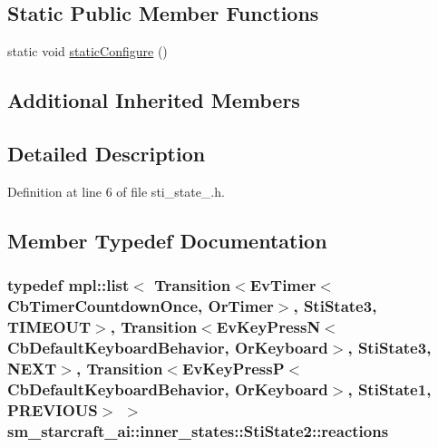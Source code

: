 \subsection*{Static Public Member Functions}
\begin{DoxyCompactItemize}
\item 
static void \hyperlink{structsm__starcraft__ai_1_1inner__states_1_1StiState2_ae80399d0de806abcde8ee983fdd1d719}{static\+Configure} ()
\end{DoxyCompactItemize}
\subsection*{Additional Inherited Members}


\subsection{Detailed Description}


Definition at line 6 of file sti\+\_\+state\+\_.\+h.



\subsection{Member Typedef Documentation}
\subsubsection[{\texorpdfstring{reactions}{reactions}}]{\setlength{\rightskip}{0pt plus 5cm}typedef mpl\+::list$<$ Transition$<$Ev\+Timer$<$Cb\+Timer\+Countdown\+Once, {\bf Or\+Timer}$>$, {\bf Sti\+State3}, {\bf T\+I\+M\+E\+O\+UT}$>$, Transition$<$Ev\+Key\+PressN$<$Cb\+Default\+Keyboard\+Behavior, {\bf Or\+Keyboard}$>$, {\bf Sti\+State3}, {\bf N\+E\+XT}$>$, Transition$<$Ev\+Key\+PressP$<$Cb\+Default\+Keyboard\+Behavior, {\bf Or\+Keyboard}$>$, {\bf Sti\+State1}, {\bf P\+R\+E\+V\+I\+O\+US}$>$ $>$ {\bf sm\+\_\+starcraft\+\_\+ai\+::inner\+\_\+states\+::\+Sti\+State2\+::reactions}}\hypertarget{structsm__starcraft__ai_1_1inner__states_1_1StiState2_a079968fbf464cd41dfa8504c5aa3cad1}{}\label{structsm__starcraft__ai_1_1inner__states_1_1StiState2_a079968fbf464cd41dfa8504c5aa3cad1}


